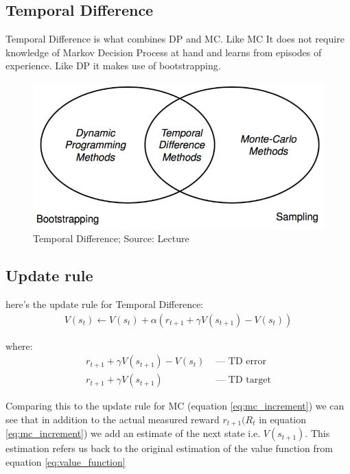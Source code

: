 \subsection{Temporal Difference}
Temporal Difference is what combines DP and MC. Like MC It does not require knowledge of Markov Decision Process at hand and 
learns from episodes of experience. Like DP it makes use of bootstrapping.

\begin{figure}[h!]
  \centering
  \includegraphics[scale=0.5]{figures/TD_diagrams.PNG}
  \caption{Temporal Difference; Source: Lecture}
  \label{fig:td}
\end{figure}

\subsection{Update rule}

here's the update rule for Temporal Difference:
\begin{align}
  V(s_t) \longleftarrow V(s_t) + \alpha (r_{t+1} + \gamma V(s_{t+1}) - V(s_t)) \label{eq:td_update}
\end{align}

where:
\begin{align*}
  r_{t+1} + \gamma V(s_{t+1}) - V(s_t) &\text{ — } \text{TD error}\\
  r_{t+1} + \gamma V(s_{t+1}) &\text { — } \text{TD target}
\end{align*}

Comparing this to the update rule for MC (equation \ref{eq:mc_increment}) we can see that in addition to the actual measured reward $r_{t+1} (R_{t}$ in equation \ref{eq:mc_increment}) we add an estimate of the next state i.e. $V(s_{t+1})$. This estimation refers us back to the original estimation of the value function from equation \ref{eq:value_function}\\

